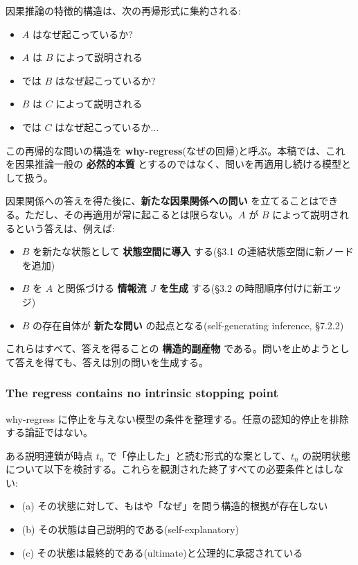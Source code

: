 因果推論の特徴的構造は、次の再帰形式に集約される:

\begin{itemize}
\item $A$ はなぜ起こっているか?
\item $A$ は $B$ によって説明される
\item では $B$ はなぜ起こっているか?
\item $B$ は $C$ によって説明される
\item では $C$ はなぜ起こっているか...
\end{itemize}

この再帰的な問いの構造を \textbf{why-regress}(なぜの回帰)と呼ぶ。本稿では、これを因果推論一般の \textbf{必然的本質} とするのではなく、問いを再適用し続ける模型として扱う。

因果関係への答えを得た後に、\textbf{新たな因果関係への問い} を立てることはできる。ただし、その再適用が常に起こるとは限らない。$A$ が $B$ によって説明されるという答えは、例えば:

\begin{itemize}
\item $B$ を新たな状態として \textbf{状態空間に導入} する(\S{}3.1 の連結状態空間に新ノードを追加)
\item $B$ を $A$ と関係づける \textbf{情報流 $J$ を生成} する(\S{}3.2 の時間順序付けに新エッジ)
\item $B$ の存在自体が \textbf{新たな問い} の起点となる(self-generating inference, \S{}7.2.2)
\end{itemize}

これらはすべて、答えを得ることの \textbf{構造的副産物} である。問いを止めようとして答えを得ても、答えは別の問いを生成する。

\subsubsection{The regress contains no intrinsic stopping point}


why-regress に停止を与えない模型の条件を整理する。任意の認知的停止を排除する論証ではない。

ある説明連鎖が時点 $t_n$ で「停止した」と読む形式的な案として、$t_n$ の説明状態について以下を検討する。これらを観測された終了すべての必要条件とはしない:

\begin{itemize}
\item (a) その状態に対して、もはや「なぜ」を問う構造的根拠が存在しない
\item (b) その状態は自己説明的である(self-explanatory)
\item (c) その状態は最終的である(ultimate)と公理的に承認されている
\end{itemize}

